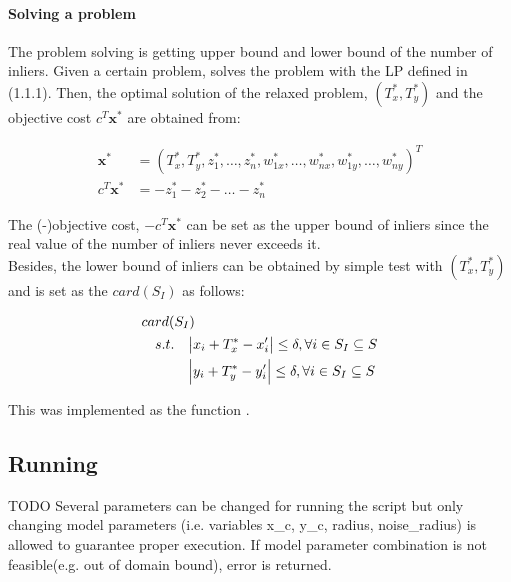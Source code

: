\documentclass[paper=a4, fontsize=11pt]{scrartcl} %
\numberwithin{equation}{section} %
\numberwithin{figure}{section} %
\numberwithin{table}{section} %
\renewcommand{\vec}[1]{\mathbf{#1}}
\begin{document}
\paragraph{Solving a problem} The problem solving is getting upper bound and lower bound of the number of inliers. Given a certain problem, solves the problem with the LP defined in (1.1.1). Then, the optimal solution of the relaxed problem, $(T_{x}^*, T_{y}^*)$ and the objective cost $c^{T}\vec{x}^*$ are obtained from:

\begin{align}
\vec{x}^* &= (T_{x}^*, T_{y}^*, z_{1}^*, \dots, z_{n}^*, w_{1x}^*, \dots, w_{nx}^*, w_{1y}^*, \dots, w_{ny}^*)^{T} \\
c^{T} \vec{x}^* &= - z_{1}^* - z_{2}^* - \dots - z_{n}^*
\end{align}

The (-)objective cost, $-c^{T}\vec{x}^*$ can be set as the upper bound of inliers since the real value of the number of inliers never exceeds it. \\

Besides, the lower bound of inliers can be obtained by simple test with $(T_{x}^*, T_{y}^*)$ and is set as the $card(S_{I})$ as follows:

\begin{equation}
\begin{split}
card(&S_{I})  \\
s.t. 	&\quad \abs{x_{i} + T_{x}^* - x_{i}'} \leq \delta, \forall i \in S_{I} \subseteq S \\
	&\quad \abs{y_{i} + T_{y}^* - y_{i}'} \leq \delta, \forall i \in S_{I} \subseteq S
\end{split}
\end{equation}

This was implemented as the function .

\subsection{Running}

TODO
Several parameters can be changed for running the script but only changing model parameters (i.e. variables x\_c, y\_c, radius, noise\_radius) is allowed to guarantee proper execution. If model parameter combination is not feasible(e.g. out of domain bound), error is returned. \\
\end{document}
